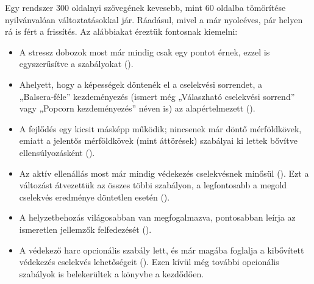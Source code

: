 Egy rendszer 300 oldalnyi szövegének kevesebb, mint 60 oldalba tömörítése nyilvánvalóan változtatásokkal jár. Ráadásul, mivel a  már nyolcéves, pár helyen rá is fért a frissítés. Az alábbiakat éreztük fontosnak kiemelni:
\begin{itemize}
    \item A stressz dobozok most már mindig csak egy pontot érnek, ezzel is egyszerűsítve a szabályokat ().
    \item Ahelyett, hogy a képességek döntenék el a cselekvési sorrendet, a „Balsera‑féle” kezdeményezés (ismert még „Válaszható cselekvési sorrend” vagy „Popcorn kezdeményezés” néven is) az alapértelmezett ().
    \item A fejlődés egy kicsit másképp működik; nincsenek már döntő mérföldkövek, emiatt a jelentős mérföldkövek (mint áttörések) szabályai ki lettek bővítve ellensúlyozásként ().
    \item Az aktív ellenállás most már mindig védekezés cselekvésnek minősül (). Ezt a változást átvezettük az összes többi szabályon, a legfontosabb a megold cselekvés eredménye döntetlen esetén ().
    \item A helyzetbehozás világosabban van megfogalmazva, pontosabban leírja az ismeretlen jellemzők felfedezését ().
    \item A védekező harc opcionális szabály lett, és már magába foglalja a kibővített védekezés cselekvés lehetőségeit (). Ezen kívül még további opcionális szabályok is belekerültek a könyvbe a  kezdődően.
\end{itemize}
